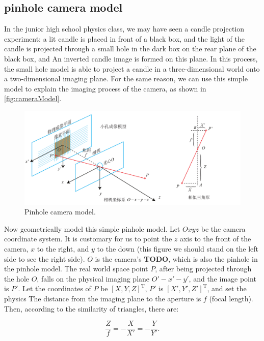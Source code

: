 \subsection{pinhole camera model}
In the junior high school physics class, we may have seen a candle projection experiment: a lit candle is placed in front of a black box, and the light of the candle is projected through a small hole in the dark box on the rear plane of the black box, and An inverted candle image is formed on this plane. In this process, the small hole model is able to project a candle in a three-dimensional world onto a two-dimensional imaging plane. For the same reason, we can use this simple model to explain the imaging process of the camera, as shown in \autoref{fig:cameraModel}.

\begin{figure}[!ht]
	\centering
	\includegraphics[width=1.0\textwidth]{chapter05/resources/cameraModel/cameraModel.pdf}
	\caption{Pinhole camera model. }
	\label{fig:cameraModel}
\end{figure}

Now geometrically model this simple pinhole model. Let $Oxyz$ be the camera coordinate system. It is customary for us to point the $z$ axis to the front of the camera, $x$ to the right, and $y$ to the down (this figure we should stand on the left side to see the right side). $O$ is the camera's \textbf{TODO}, which is also the pinhole in the pinhole model. The real world space point $P$, after being projected through the hole $O$, falls on the physical imaging plane $O'-x'-y'$, and the image point is $P'$. Let the coordinates of $P$ be $[X,Y,Z]^\mathrm{T}$, $P'$ is $[X',Y',Z']^\mathrm{T}$, and set the physics The distance from the imaging plane to the aperture is $f$ (focal length). Then, according to the similarity of triangles, there are:
\clearpage

\begin{equation}
\frac{Z}{f} = -\frac{X}{{X'}} =-\frac{Y}{{Y'}}.
\end{equation}

